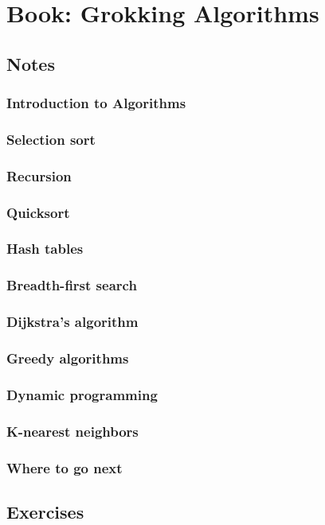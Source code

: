 \twocolumn
\chapter{Book: Grokking Algorithms}
\section{Notes}
\subsection{Introduction to Algorithms}
\subsection{Selection sort}
\subsection{Recursion}
\subsection{Quicksort}
\subsection{Hash tables}
\subsection{Breadth-first search}
\subsection{Dijkstra's algorithm}
\subsection{Greedy algorithms}
\subsection{Dynamic programming}
\subsection{K-nearest neighbors}
\subsection{Where to go next}

\onecolumn
\section{Exercises}

